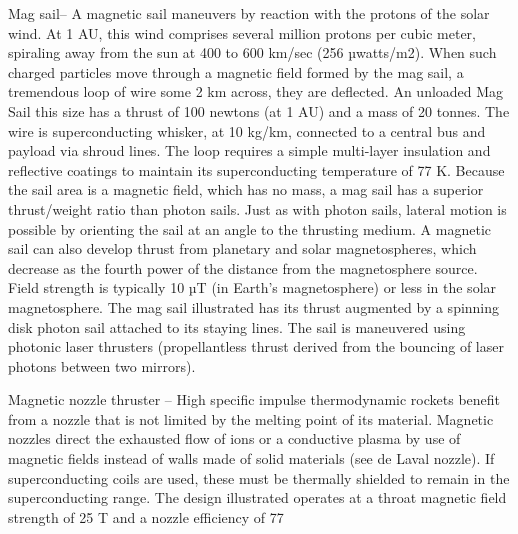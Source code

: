 \documentclass[a4paper]{book}
\begin{document}
Mag sail– A magnetic sail maneuvers by reaction with the protons of the solar wind.  At 1 AU, this wind comprises several million protons per cubic meter, spiraling away from the sun at 400 to 600 km/sec (256 µwatts/m2).  When such charged particles move through a magnetic field formed by the mag sail, a tremendous loop of wire some 2 km across, they are deflected. An unloaded Mag Sail this size has a thrust of 100 newtons (at 1 AU) and a mass of 20 tonnes. The wire is superconducting whisker, at 10 kg/km, connected to a central bus and payload via shroud lines. The loop requires a simple multi-layer insulation and reflective coatings to maintain its superconducting temperature of 77 K. Because the sail area is a magnetic field, which has no mass, a mag sail has a superior thrust/weight ratio than photon sails.  Just as with photon sails, lateral motion is possible by orienting the sail at an angle to the thrusting medium.  A magnetic sail can also develop thrust from planetary and solar magnetospheres, which decrease as the fourth power of the distance from the magnetosphere source. Field strength is typically 10 µT (in Earth’s magnetosphere) or less in the solar magnetosphere.  The mag sail illustrated has its thrust augmented by a spinning disk photon sail attached to its staying lines.  The sail is maneuvered using photonic laser thrusters (propellantless thrust derived from the bouncing of laser photons between two mirrors). 
 
Magnetic nozzle thruster – High specific impulse thermodynamic rockets benefit from a nozzle that is not limited by the melting point of its material. Magnetic nozzles direct the exhausted flow of ions or a conductive plasma by use of magnetic fields instead of walls made of solid materials (see de Laval nozzle). If superconducting coils are used, these must be thermally shielded to remain in the superconducting range. The design illustrated operates at a throat magnetic field strength of 25 T and a nozzle efficiency of 77%
 
\end{document}
